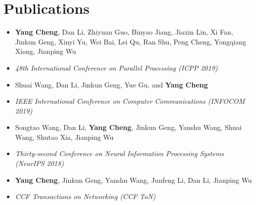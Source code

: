 \documentclass{resume}
\begin{document}
\section{Publications}
\begin{itemize}
	\item \textbf{Yang Cheng}, Dan Li, Zhiyuan Guo, Binyao Jiang, Jiaxin Lin, Xi Fan, Jinkun Geng, Xinyi Yu, Wei Bai, Lei Qu, Ran Shu, Peng Cheng, Yongqiang Xiong, Jianping Wu
	\item \textit{48th International Conference on Parallel Processing (ICPP 2019)}
\end{itemize}

\begin{itemize}
	\item Shuai Wang, Dan Li, Jinkun Geng, Yue Gu, and \textbf{Yang Cheng}
	\item \textit{IEEE International Conference on Computer Communications (INFOCOM 2019)}
\end{itemize}

\begin{itemize}
	\item Songtao Wang, Dan Li, \textbf{Yang Cheng}, Jinkun Geng, Yanshu Wang, Shuai Wang, Shutao Xia, Jianping Wu
	\item \textit{Thirty-second Conference on Neural Information Processing Systems (NeurIPS 2018)}
\end{itemize}


\begin{itemize}
	\item \textbf{Yang Cheng}, Jinkun Geng, Yanshu Wang, Junfeng Li, Dan Li, Jianping Wu
	\item \textit{CCF Transactions on Networking (CCF ToN)}
\end{itemize}
\end{document}

